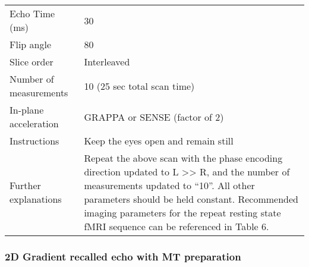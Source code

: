 \documentclass[
	a4paper, 
	11.5pt,
	headings=small, 
	twoside, 
	titlepage=firstiscover, 
 	pagesize=auto,
  	version=last,
	open=any,
	BCOR=14mm,
  	chapterprefix=false]{scrbook}
\begin{document}
\begin{table}[H]
\begin{tabularx}{1\textwidth}{@{}X *{1}{X}@{}}
Echo Time (ms)                                                                        & 30                                          \\
Flip angle                                                                                 	& 80                                          \\
Slice order 									& Interleaved                                 \\
Number of measurements                                                  & 10 (25 sec total scan time)                 \\
In-plane acceleration                                                             & GRAPPA or SENSE (factor of 2)               \\
Instructions									& Keep the eyes open and remain still         \\
Further explanations                                                             & Repeat the above scan with the phase encoding direction updated to L >> R, and the number of measurements updated to “10”. All other parameters should be held constant. Recommended imaging parameters for the repeat resting state fMRI sequence can be referenced in Table 6.                                            \\
\bottomrule
\end{tabularx}
\end{table}

\subsubsection{2D Gradient recalled echo with MT preparation}
\end{document}
